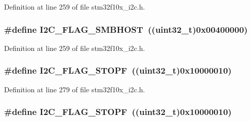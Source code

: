 Definition at line 259 of file stm32f10x\+\_\+i2c.\+h.

\subsubsection[{\texorpdfstring{I2\+C\+\_\+\+F\+L\+A\+G\+\_\+\+S\+M\+B\+H\+O\+ST}{I2C_FLAG_SMBHOST}}]{\setlength{\rightskip}{0pt plus 5cm}\#define I2\+C\+\_\+\+F\+L\+A\+G\+\_\+\+S\+M\+B\+H\+O\+ST~(({\bf uint32\+\_\+t})0x00400000)}\hypertarget{group___i2_c__flags__definition_gaf15403a1852f39aaadbb8942ba98d97e}{}\label{group___i2_c__flags__definition_gaf15403a1852f39aaadbb8942ba98d97e}


Definition at line 259 of file stm32f10x\+\_\+i2c.\+h.

\subsubsection[{\texorpdfstring{I2\+C\+\_\+\+F\+L\+A\+G\+\_\+\+S\+T\+O\+PF}{I2C_FLAG_STOPF}}]{\setlength{\rightskip}{0pt plus 5cm}\#define I2\+C\+\_\+\+F\+L\+A\+G\+\_\+\+S\+T\+O\+PF~(({\bf uint32\+\_\+t})0x10000010)}\hypertarget{group___i2_c__flags__definition_gacc7d993963e199a6ddba391dab8da896}{}\label{group___i2_c__flags__definition_gacc7d993963e199a6ddba391dab8da896}


Definition at line 279 of file stm32f10x\+\_\+i2c.\+h.

\subsubsection[{\texorpdfstring{I2\+C\+\_\+\+F\+L\+A\+G\+\_\+\+S\+T\+O\+PF}{I2C_FLAG_STOPF}}]{\setlength{\rightskip}{0pt plus 5cm}\#define I2\+C\+\_\+\+F\+L\+A\+G\+\_\+\+S\+T\+O\+PF~(({\bf uint32\+\_\+t})0x10000010)}\hypertarget{group___i2_c__flags__definition_gacc7d993963e199a6ddba391dab8da896}{}\label{group___i2_c__flags__definition_gacc7d993963e199a6ddba391dab8da896}



